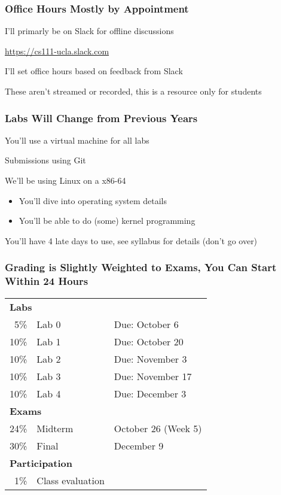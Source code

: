   \begin{frame}
    \frametitle{Office Hours Mostly by Appointment}

    I'll primarly be on Slack for offline discussions

    \vspace{2em}

    \url{https://cs111-ucla.slack.com}

    \vspace{2em}

    I'll set office hours based on feedback from Slack

    \vspace{2em}

    These aren't streamed or recorded, this is a resource only for students
  \end{frame}

  \begin{frame}
    \frametitle{Labs Will Change from Previous Years}

    You'll use a virtual machine for all labs

    \vspace{2em}

    Submissions using Git

    \vspace{2em}

    We'll be using Linux on a x86-64

    \begin{itemize}
      \item You'll dive into operating system details
      \item You'll be able to do (some) kernel programming
    \end{itemize}

    \vspace{2em}

    You'll have 4 late days to use, see syllabus for details (don't go over)
  \end{frame}

  \begin{frame}
    \frametitle{Grading is Slightly Weighted to Exams, You Can Start Within 24 Hours}

    \begin{tabular}{rll}
      \multicolumn{2}{l}{\bfseries Labs} \\
       5\% & Lab 0 & Due: October 6 \\
      10\% & Lab 1 & Due: October 20 \\
      10\% & Lab 2 & Due: November 3 \\
      10\% & Lab 3 & Due: November 17\\
      10\% & Lab 4 & Due: December 3 \\
      \multicolumn{2}{l}{\bfseries Exams} \\
      24\% & Midterm & October 26 (Week 5) \\
      30\% & Final & December 9 \\
      \multicolumn{2}{l}{\bfseries Participation} \\
       1\% & Class evaluation \\
    \end{tabular}
  \end{frame}

